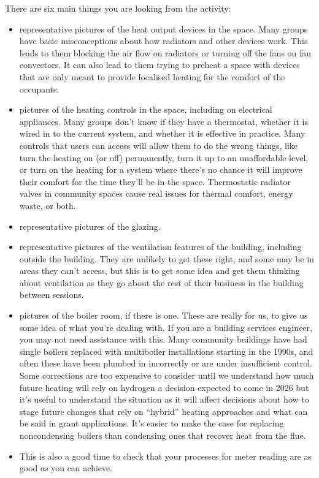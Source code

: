 \documentclass[letterpaper,10pt,english]{jupyterBook}
\begin{document}
\sphinxAtStartPar
There are six main things you are looking from the activity:
\begin{itemize}
\item {} 
\sphinxAtStartPar
representative pictures of the heat output devices in the space.  Many groups have basic misconceptions about how radiators and other devices work.  This leads to them blocking the air flow on radiators or turning off the fans on fan convectors.  It can also lead to them trying to preheat a space with devices that are only meant to provide localised heating for the comfort of the occupants.

\item {} 
\sphinxAtStartPar
pictures of the heating controls in the space, including on electrical appliances.  Many groups don’t know if they have a thermostat, whether it is wired in to the current system, and whether it is effective in practice.  Many controls that users can access will allow them to do the wrong things, like turn the heating on (or off) permanently, turn it up to an unaffordable level, or turn on the heating for a system where there’s no chance it will improve their comfort for the time they’ll be in the space.  Thermostatic radiator valves in community spaces cause real issues for thermal comfort, energy waste, or both.

\item {} 
\sphinxAtStartPar
representative pictures of the glazing.

\item {} 
\sphinxAtStartPar
representative pictures of the ventilation features of the building, including outside the building.  They are unlikely to get these right, and some may be in areas they can’t access, but this is to get some idea and get them thinking about ventilation as they go about the rest of their business in the building between sessions.

\item {} 
\sphinxAtStartPar
pictures of the boiler room, if there is one.  These are really for us, to give us some idea of what you’re dealing with.    If you are a building services engineer, you may not need assistance with this.  Many community buildings have had single boilers replaced with multi\sphinxhyphen{}boiler installations starting in the 1990s, and often these have been plumbed in incorrectly or are under insufficient control.  Some corrections are too expensive to consider until we understand how much future heating will rely on hydrogen \sphinxhyphen{} a decision expected to come in 2026 \sphinxhyphen{} but it’s useful to understand the situation as it will affect decisions about how to stage future changes that rely on “hybrid” heating approaches and what can be said in grant applications.  It’s easier to make the case for replacing non\sphinxhyphen{}condensing boilers than condensing ones that recover heat from the flue.

\item {} 
\sphinxAtStartPar
This is also a good time to check that your processes for meter reading are as good as you can achieve.

\end{itemize}
\end{document}
